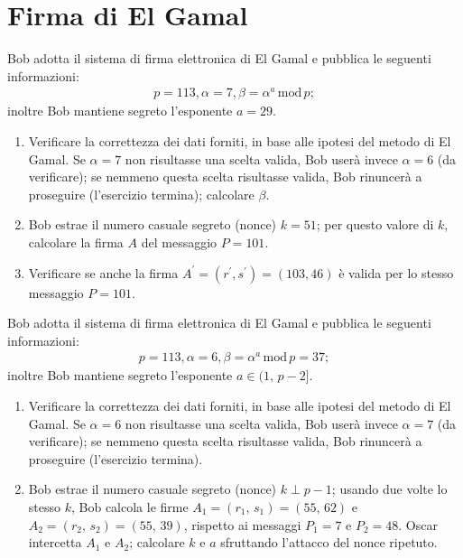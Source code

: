     \bigskip
    \section{Firma di El Gamal}
        Bob adotta il sistema di firma elettronica di El Gamal e pubblica le seguenti informazioni:
        \begin{gather*}
            p=113, \alpha = 7, \beta = \alpha^a\,\mathrm{mod}\,p
        ;\end{gather*}
        inoltre Bob mantiene segreto l'esponente $a=29$.
        \begin{enumerate}
            \item Verificare la correttezza dei dati forniti, in base alle ipotesi del metodo di El Gamal. 
                Se $\alpha=7$ non risultasse una scelta valida, Bob userà invece $\alpha=6$ (da verificare); 
                se nemmeno questa scelta risultasse valida, Bob rinuncerà a proseguire (l'esercizio termina); 
                calcolare $\beta$.
            \item Bob estrae il numero casuale segreto (nonce) $k=51$; per questo valore di $k$, calcolare 
                la firma $A$ del messaggio $P=101$.
            \item Verificare se anche la firma $A^{\prime}=(r^{\prime}, s^{\prime})=(103,46)$ è valida per 
                lo stesso messaggio $P=101$.
        \end{enumerate}

        Bob adotta il sistema di firma elettronica di El Gamal e pubblica le seguenti informazioni:
        \begin{gather*}
            p=113, \alpha = 6, \beta = \alpha^a\,\mathrm{mod}\,p = 37
        ;\end{gather*}
        inoltre Bob mantiene segreto l'esponente $a\in (1,\,p-2]$.
        \begin{enumerate}
            \item Verificare la correttezza dei dati forniti, in base alle ipotesi del metodo di El Gamal. 
                Se $\alpha=6$ non risultasse una scelta valida, Bob userà invece $\alpha=7$ (da verificare); 
                se nemmeno questa scelta risultasse valida, Bob rinuncerà a proseguire (l'esercizio termina).
            \item Bob estrae il numero casuale segreto (nonce) $k\perp p-1$; usando due volte lo stesso $k$, 
                Bob calcola le firme $A_1=(r_1,\,s_1)=(55,\,62)$ e $A_2=(r_2,\,s_2)=(55,\,39)$, rispetto ai 
                messaggi $P_1=7$ e $P_2=48$. Oscar intercetta $A_1$ e $A_2$; calcolare $k$ e $a$ sfruttando 
                l'attacco del nonce ripetuto.
        \end{enumerate}

